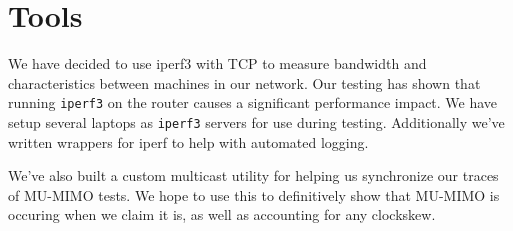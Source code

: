 \section{Tools}

We have decided to use iperf3 with TCP to measure bandwidth and
characteristics between machines in our network. Our testing has shown
that running \texttt{iperf3} on the router causes a significant
performance impact. We have setup several laptops as \texttt{iperf3}
servers for use during testing. Additionally we've written wrappers
for iperf to help with automated logging.

We've also built a custom multicast utility for helping us synchronize
our traces of MU-MIMO tests. We hope to use this to definitively show
that MU-MIMO is occuring when we claim it is, as well as accounting
for any clockskew.

